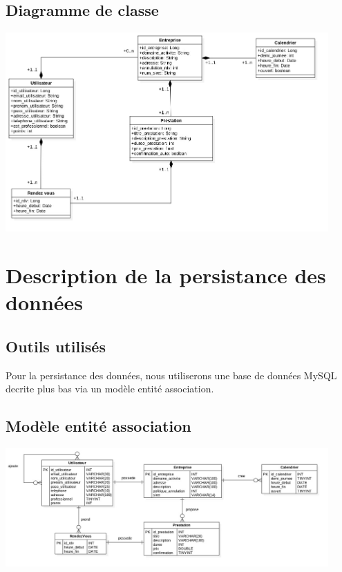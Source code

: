 \documentclass{article}
\begin{document}
\subsection{Diagramme de classe}
\begin{center}
  \includegraphics[width=350pt]{diagram/class}
\end{center}


\section{Description de la persistance des données}
\subsection{Outils utilisés}
Pour la persistance des données, nous utiliserons une base de données MySQL decrite plus bas via un modèle entité association.
\subsection{Modèle entité association}
\begin{center}
  \includegraphics[width=350pt]{diagram/entite}
\end{center}
\end{document}
